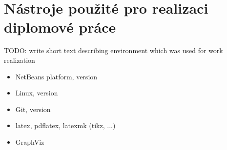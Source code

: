\chapter{Nástroje použité pro realizaci diplomové práce}
TODO: write short text describing environment which was used for work realization

\begin{itemize} 
\item NetBeans platform, version
\item Linux, version
\item Git, version
\item latex, pdflatex, latexmk (tikz, ...)
\item GraphViz
\end{itemize}
